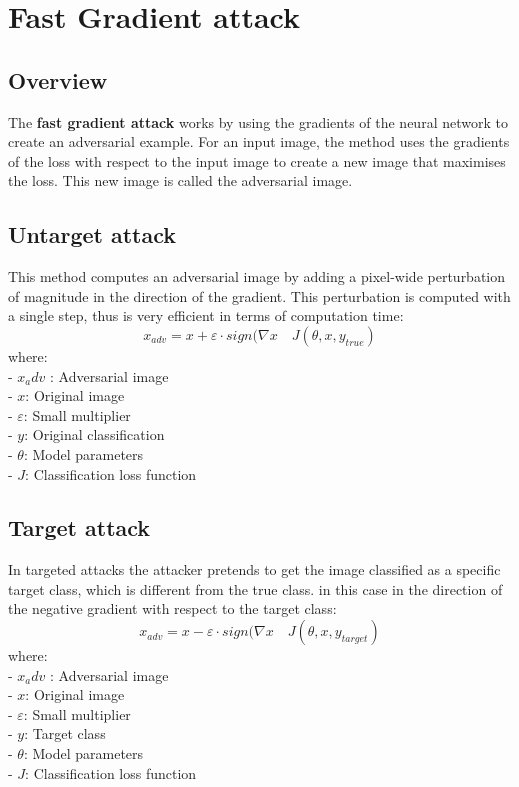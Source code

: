 \section{Fast Gradient attack}
\subsection{Overview}
The \textbf{fast gradient attack} works by using the gradients of the neural network to create an adversarial example. For an input image, the method uses the gradients of the loss with respect to the input image to create a new image that maximises the loss. This new image is called the adversarial image.

\subsection{Untarget attack}
This method computes an adversarial image by adding a pixel-wide perturbation of magnitude in the direction of the gradient. This perturbation is computed with a single step, thus is very efficient in terms of computation time:
\[x_{adv} =  x + \varepsilon \cdot sign(\nabla x\quad J( \theta, x, y_{true}) \]
where:\\
- $x_adv$ : Adversarial image\\
- $x$: Original image\\
- $\varepsilon$: Small multiplier\\
- $y$: Original classification\\
- $\theta$: Model parameters\\
- $J$: Classification loss function\\

\subsection{Target attack}
In targeted attacks the attacker pretends to get the image classified as a specific target class, which is different from the true class. in this case in the direction of the negative gradient with respect to the target class:
\[x_{adv} =  x - \varepsilon \cdot sign(\nabla x\quad J( \theta, x, y_{target}) \]
where:\\
- $x_adv$ : Adversarial image\\
- $x$: Original image\\
- $\varepsilon$: Small multiplier\\
- $y$: Target class\\
- $\theta$: Model parameters\\
- $J$: Classification loss function\\

